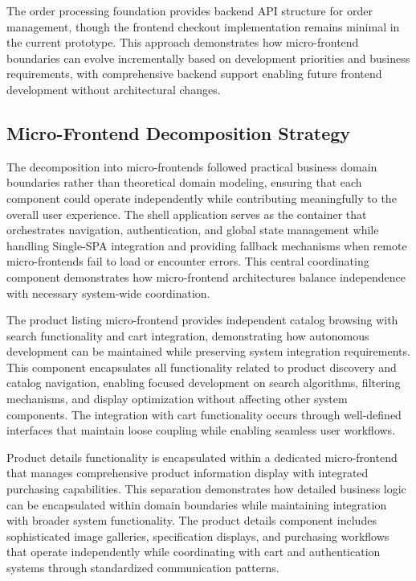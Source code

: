 \documentclass[12pt,a4paper]{report}
\begin{document}
The order processing foundation provides backend API structure for order management, though the frontend checkout implementation remains minimal in the current prototype. This approach demonstrates how micro-frontend boundaries can evolve incrementally based on development priorities and business requirements, with comprehensive backend support enabling future frontend development without architectural changes.

\subsection{Micro-Frontend Decomposition Strategy}

The decomposition into micro-frontends followed practical business domain boundaries rather than theoretical domain modeling, ensuring that each component could operate independently while contributing meaningfully to the overall user experience. The shell application serves as the container that orchestrates navigation, authentication, and global state management while handling Single-SPA integration and providing fallback mechanisms when remote micro-frontends fail to load or encounter errors. This central coordinating component demonstrates how micro-frontend architectures balance independence with necessary system-wide coordination.

The product listing micro-frontend provides independent catalog browsing with search functionality and cart integration, demonstrating how autonomous development can be maintained while preserving system integration requirements. This component encapsulates all functionality related to product discovery and catalog navigation, enabling focused development on search algorithms, filtering mechanisms, and display optimization without affecting other system components. The integration with cart functionality occurs through well-defined interfaces that maintain loose coupling while enabling seamless user workflows.

Product details functionality is encapsulated within a dedicated micro-frontend that manages comprehensive product information display with integrated purchasing capabilities. This separation demonstrates how detailed business logic can be encapsulated within domain boundaries while maintaining integration with broader system functionality. The product details component includes sophisticated image galleries, specification displays, and purchasing workflows that operate independently while coordinating with cart and authentication systems through standardized communication patterns.
\end{document}
